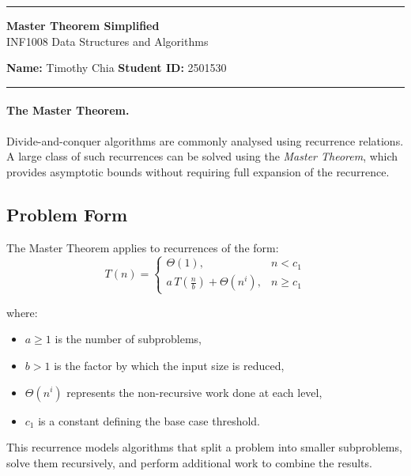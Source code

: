 \documentclass[12pt]{article}
\begin{document}
\begin{center}
	\hrule
	\vspace{0.4cm}
	{\textbf{\large Master Theorem Simplified}}\\[0.2cm]
	INF1008 Data Structures and Algorithms
\end{center}

\textbf{Name:} Timothy Chia\hspace{\fill} \textbf{Student ID:} 2501530\\

\hrule

\vspace{0.3cm}

\paragraph{The Master Theorem.} Divide-and-conquer algorithms are commonly analysed using recurrence relations. A large class of such recurrences can be solved using the \textit{Master Theorem}, which provides asymptotic bounds without requiring full expansion of the recurrence.

\vspace{0.2cm}

\subsection*{Problem Form}

The Master Theorem applies to recurrences of the form:
\[
	T(n) =
	\begin{cases}
		\Theta(1),                                      & n < c_1   \\
		a \, T\!\left(\frac{n}{b}\right) + \Theta(n^i), & n \ge c_1
	\end{cases}
\]

where:
\begin{itemize}[leftmargin=1.2cm]
	\item $a \ge 1$ is the number of subproblems,
	\item $b > 1$ is the factor by which the input size is reduced,
	\item $\Theta(n^i)$ represents the non-recursive work done at each level,
	\item $c_1$ is a constant defining the base case threshold.
\end{itemize}

This recurrence models algorithms that split a problem into smaller subproblems,
solve them recursively, and perform additional work to combine the results.
\end{document}
